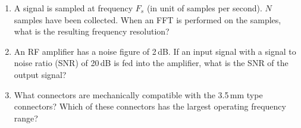\documentclass[letterpaper, 11pt]{article}
\begin{document}
\begin{enumerate}[itemsep=0.1ex, label=\alph*)]
	\item A signal is sampled at frequency $F_s$ (in unit of samples per second). $N$ samples have been collected. When an FFT is performed on the samples, what is the resulting frequency resolution?
	
	\item An RF amplifier has a noise figure of 2\,dB. If an input signal with a signal to noise ratio (SNR) of 20\,dB is fed into the amplifier, what is the SNR of the output signal?
	
	\item What connectors are mechanically compatible with the 3.5\,mm type connectors? Which of these connectors has the largest operating frequency range?

\end{enumerate}
\end{document}
